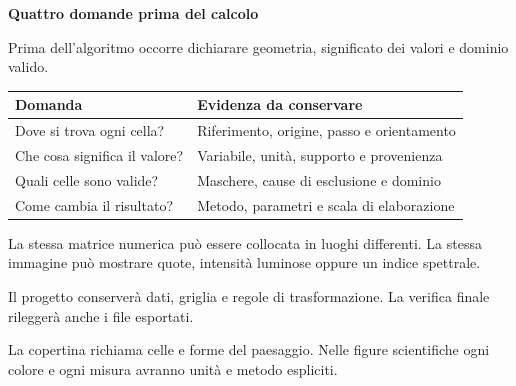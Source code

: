 \documentclass[12pt,aspectratio=1610]{beamer}
\newcommand{\PBody}[1]{\par{\fontsize{11.3}{14.8}\selectfont #1\par}}
\newcommand{\PSmall}[1]{\par{\fontsize{9.8}{13.1}\selectfont #1\par}}
\newcommand{\PInfo}[1]{%
\begin{tcolorbox}[enhanced,arc=1.6mm,boxrule=.55pt,colback=GeoTint,
 colframe=Rule!80!Classical,left=2.3mm,right=2.3mm,top=2mm,bottom=2mm,
 before skip=1mm,after skip=1mm]
\PSmall{#1}\end{tcolorbox}}
\begin{document}
\begin{frame}[plain]\hypertarget{slide4}{}
\begin{lrbox}{\TitleBox}
\begin{minipage}[t]{17.7cm}\raggedright\color{Ink}\fontsize{11.3}{14.8}\selectfont
\color{Navy}\bfseries\fontsize{20.6}{24.5}\selectfont Quattro domande prima del calcolo
\end{minipage}\end{lrbox}

\begin{lrbox}{\RecallBox}
\begin{minipage}[t]{14.3cm}\raggedright\color{Ink}\fontsize{11.3}{14.8}\selectfont
\fontsize{10.3}{13.8}\selectfont Prima dell’algoritmo occorre dichiarare geometria, significato dei valori e dominio valido.
\end{minipage}\end{lrbox}

\begin{lrbox}{\PilotLeftBox}
\begin{minipage}[t]{10.05cm}\raggedright\color{Ink}\fontsize{11.3}{14.8}\selectfont
{\fontsize{10.2}{13.1}\selectfont\renewcommand{\arraystretch}{1.45}\begin{tabular}{@{}p{4.1cm}p{4.9cm}@{}}\toprule
\textbf{Domanda} & \textbf{Evidenza da conservare}\\\midrule
Dove si trova ogni cella? & Riferimento, origine, passo e orientamento\\
Che cosa significa il valore? & Variabile, unità, supporto e provenienza\\
Quali celle sono valide? & Maschere, cause di esclusione e dominio\\
Come cambia il risultato? & Metodo, parametri e scala di elaborazione\\
\bottomrule\end{tabular}}

\end{minipage}\end{lrbox}

\begin{lrbox}{\PilotRightBox}
\begin{minipage}[t]{7.55cm}\raggedright\color{Ink}\fontsize{11.3}{14.8}\selectfont
\PBody{La stessa matrice numerica può essere collocata in luoghi differenti. La stessa immagine può mostrare quote, intensità luminose oppure un indice spettrale.}
\vspace{2.5mm}
\PInfo{Il progetto conserverà dati, griglia e regole di trasformazione. La verifica finale rileggerà anche i file esportati.}
\PBody{La copertina richiama celle e forme del paesaggio. Nelle figure scientifiche ogni colore e ogni misura avranno unità e metodo espliciti.}
\vspace{2.5mm}


\end{minipage}
\end{lrbox}
\end{frame}
\end{document}
